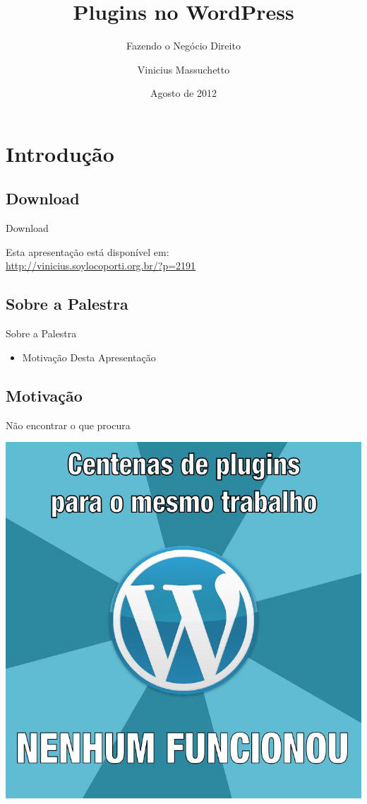 \documentclass{beamer}
\title{Plugins no WordPress}
\subtitle{Fazendo o Negócio Direito}
\author{Vinicius Massuchetto}
\institute{WordCamp São Paulo 2012}
\date{Agosto de 2012}
\begin{document}
\frame{\titlepage}

\section{Introdução}

\subsection{Download}

\begin{frame}{Download}
  \begin{center}
    Esta apresentação está disponível em: \\
    \url{http://vinicius.soylocoporti.org.br/?p=2191}
  \end{center}
\end{frame}

\subsection{Sobre a Palestra}

\begin{frame}{Sobre a Palestra}
\begin{itemize}
  \item Motivação Desta Apresentação
\end{itemize}
\end{frame}

\subsection{Motivação}

\begin{frame}{Não encontrar o que procura}
  \begin{center}
    \includegraphics[height=0.8\textheight]{./img/plugins.jpg}
  \end{center}
\end{frame}
\end{document}
